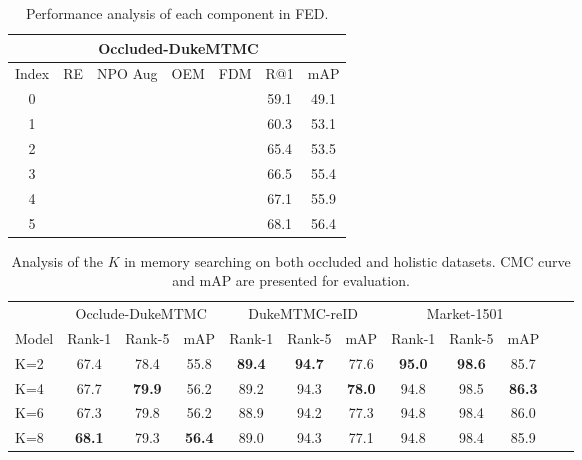 \documentclass[10pt,twocolumn,letterpaper]{article}
\begin{document}
\begin{table}[t]
	\centering
	\small
	\begin{tabular}{ccccccc}
	    \toprule
		\multicolumn{1}{c}{} & \multicolumn{5}{c}{Occluded-DukeMTMC}  \\
		\hline
		\multicolumn{1}{l}{Index} & RE & NPO Aug & OEM & FDM &  R@1 & mAP \\
		\hline
		\multicolumn{1}{c}{0} & \XSolidBrush & \XSolidBrush  & \XSolidBrush & \XSolidBrush  & 59.1 & 49.1 \\
		\multicolumn{1}{c}{1} & \Checkmark & \XSolidBrush  & \XSolidBrush & \XSolidBrush  & 60.3 & 53.1 \\
		\multicolumn{1}{c}{2} & \XSolidBrush & \Checkmark & \XSolidBrush & \XSolidBrush & 65.4 & 53.5  \\
		\multicolumn{1}{c}{3} & \XSolidBrush & \Checkmark & \Checkmark & \XSolidBrush & 66.5 & 55.4\\
		\multicolumn{1}{c}{4} & \XSolidBrush & \Checkmark & \XSolidBrush & \Checkmark & 67.1 & 55.9  \\
		\multicolumn{1}{c}{5} & \XSolidBrush & \Checkmark & \Checkmark & \Checkmark & 68.1 & 56.4 \\
		\bottomrule
	\end{tabular}
	\caption{Performance analysis of each component in FED. 
	}
	\label{ablation}
\end{table}


\begin{table*}[t]
	\centering
	\small
	\begin{tabular}{cccccccccccc}
	    \toprule
		\multicolumn{1}{c}{} & \multicolumn{3}{c}{Occlude-DukeMTMC} & \multicolumn{3}{c}{DukeMTMC-reID} & \multicolumn{3}{c}{Market-1501} \\
		\multicolumn{1}{l}{Model} & Rank-1 & Rank-5 & mAP & Rank-1 & Rank-5 & mAP & Rank-1 & Rank-5 & mAP \\
		\hline
		\multicolumn{1}{l}{K=2} & 67.4 & 78.4 & 55.8 & \textbf{89.4} & \textbf{94.7} & 77.6 & \textbf{95.0} & \textbf{98.6} & 85.7\\
		\multicolumn{1}{l}{K=4} & 67.7 & \textbf{79.9} & 56.2 & 89.2 & 94.3 & \textbf{78.0} & 94.8 & 98.5 & \textbf{86.3}\\
		\multicolumn{1}{l}{K=6} & 67.3 & 79.8 & 56.2 & 88.9 & 94.2 &77.3 & 94.8 & 98.4 & 86.0\\
		\multicolumn{1}{l}{K=8} & \textbf{68.1} & 79.3 & \textbf{56.4} & 89.0 & 94.3 & 77.1 & 94.8 & 98.4 & 85.9\\
		\bottomrule
	\end{tabular}
	\caption{Analysis of the $K$ in memory searching on both occluded and holistic datasets. CMC curve and mAP are presented for evaluation.
	}
	\label{memorysearch}
\end{table*}
\end{document}
